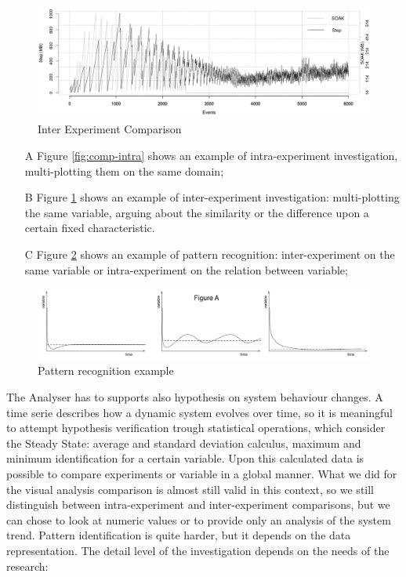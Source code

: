 \begin{figure}[tbh]
  \centering
	\includegraphics[width=0.80\linewidth]{images/comp-inter}
	\caption{Inter Experiment Comparison} 
  	\label{fig:comp-inter}
\end{figure}

\begin{enumerate}
\item[A] Figure \ref{fig:comp-intra} shows an example of intra-experiment investigation, multi-plotting them on the same domain; 
\item[B] Figure \ref{fig:comp-inter} shows an example of inter-experiment investigation: multi-plotting the same variable, arguing about the similarity or the difference upon a certain fixed characteristic.  
\item[C] Figure \ref{fig:patterns}  shows an example of pattern recognition: inter-experiment on the same variable or intra-experiment on the relation between variable;
\end{enumerate}

\begin{figure}[tbh]
  \centering
	\includegraphics[width=0.80\linewidth]{images/patterns}
	\caption{Pattern recognition example} 
  	\label{fig:patterns}
\end{figure}

The Analyser has to supports also hypothesis on system behaviour changes. A time serie describes how a dynamic system evolves over time, so it is meaningful to attempt hypothesis verification trough statistical operations, which consider the Steady State: average and standard deviation calculus, maximum and minimum identification for a certain variable. Upon this calculated data is possible to compare experiments or variable in a global manner. What we did for the visual analysis comparison is almost still valid in this context, so we still distinguish between intra-experiment and inter-experiment comparisons, but we can chose to look at numeric values or to provide only an analysis of the system trend. Pattern identification is quite harder, but it depends on the data representation. The detail level of the investigation depends on the needs of the research:

